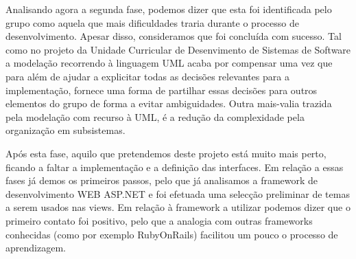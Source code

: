 ﻿\documentclass[12pt,a4paper]{article}
\begin{document}
Analisando agora a segunda fase, podemos dizer que esta foi identificada pelo grupo como aquela que mais dificuldades traria durante o processo de desenvolvimento. Apesar disso, consideramos que foi concluída com sucesso. Tal como no projeto da Unidade Curricular de Desenvimento de Sistemas de Software a modelação recorrendo à linguagem UML acaba por compensar uma vez que para além de ajudar a explicitar todas as decisões relevantes para a implementação, fornece uma forma de partilhar essas decisões para outros elementos do grupo de forma a evitar ambiguidades. Outra mais-valia trazida pela modelação com recurso à UML, é a redução da complexidade pela organização em subsistemas.

Após esta fase, aquilo que pretendemos deste projeto está muito mais perto, ficando a faltar a implementação e a definição das interfaces. Em relação a essas fases já demos os primeiros passos, pelo que já analisamos a framework de desenvolvimento WEB ASP.NET e foi efetuada uma selecção preliminar de temas a serem usados nas views. Em relação à framework a utilizar podemos dizer que o primeiro contato foi positivo, pelo que a analogia com outras frameworks conhecidas (como por exemplo RubyOnRails) facilitou um pouco o processo de aprendizagem. 
\end{document}

